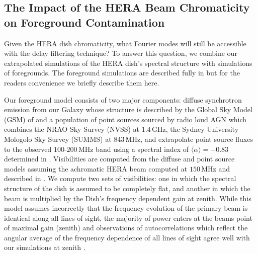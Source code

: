 \documentclass[twocolumn]{emulateapj}
\begin{document}






\subsection{The Impact of the HERA Beam Chromaticity on Foreground Contamination}\label{ssec:Leakage}

Given the HERA dish chromaticity, what Fourier modes will still be accessible with the delay filtering technique? To answer this question, we combine our extrapolated simulations of the HERA dish's spectral structure with simulations of foregrounds. The foreground simulations are described fully in \citep{Thyagarajan:2016} but for the readers convenience we briefly describe them here. 

Our foreground model consists of two major components: diffuse synchrotron emission from our Galaxy whose structure is described by the Global Sky Model (GSM) of \citet{deOliveiraCosta:2008} and a population of point sources sourced by radio loud AGN which combines the NRAO Sky Survey (NVSS) \citep{Condon:1998} at 1.4\,GHz, the Sydney University Mologolo Sky Survey (SUMMS) \citep{Bock:1999} at 843\,MHz, and extrapolate point source fluxes to the observed $100$-$200$\,MHz band using a spectral index of $\langle \alpha \rangle=-0.83$ determined in \citet{Mauch:2003}. Visibilities are computed from the diffuse and point source models assuming the achromatic HERA beam computed at $150$\,MHz and described in \citep{Neben:2016}. We compute two sets of visibilities: one in which the spectral structure of the dish is assumed to be completely flat, and another in which the beam is multiplied by the Dish's frequency dependent gain at zenith. While this model assumes incorrectly that the frequency evolution of the primary beam is identical along all lines of sight, the majority of power enters at the beams point of maximal gain (zenith) and observations of autocorrelations which reflect the angular average of the frequency dependence of all lines of sight agree well with our simulations at zenith \citep{Patra:2016}. 
\end{document}
